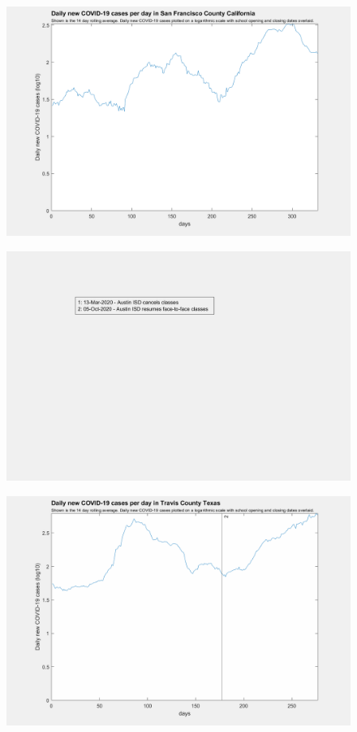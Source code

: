 \documentclass[]{article}
\begin{document}
\begin{figure}[!h]
	\includegraphics[width=\linewidth]{images/san_francisco_cases_school_log.png}
	\caption{}
	\label{fig:images/san_francisco_cases_school_logLabel}
\end{figure}

\begin{figure}[!h]
	\includegraphics[width=\linewidth]{legends/travis_school_legend.png}
	\caption{}
	\label{fig:legends/travis_school_legendLabel}
\end{figure}

\begin{figure}[!h]
	\includegraphics[width=\linewidth]{images/travis_cases_school_log.png}
	\caption{}
	\label{fig:images/travis_cases_school_logLabel}
\end{figure}
\end{document}
